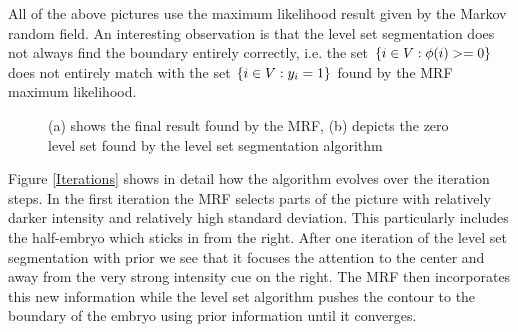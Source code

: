 \documentclass{article} %
\begin{document}
All of the above pictures use the maximum likelihood result given by the Markov random field. An interesting observation is that the level set segmentation does not always find the boundary entirely correctly, i.e. the set $\{i\in V: \phi(i) >=0\}$  does not entirely match with the set $\{i\in V: y_i =1\}$ found by the MRF maximum likelihood. 
\begin{figure}[htbp]
\centering
{}
\caption{(a) shows the final result found by the MRF, (b) depicts the zero level set found by the level set segmentation algorithm}
\label{MRFvsCV}
\end{figure}

Figure \ref{Iterations} shows in detail how the algorithm evolves over the iteration steps. In the first iteration the MRF selects parts of the picture with relatively darker intensity and relatively high standard deviation. This particularly includes the half-embryo which sticks in from the right. After one iteration of the level set segmentation with prior we see that it focuses the attention to the center and away from the very strong intensity cue on the right. The MRF then incorporates this new information while the level set algorithm pushes the contour to the boundary of the embryo using prior information until it converges.
\end{document}
